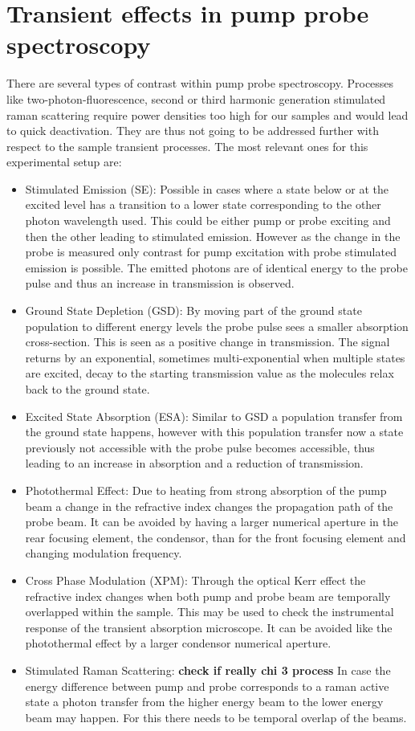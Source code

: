 \documentclass[twoside,openright]{scrreprt}
\begin{document}
\section{Transient effects in pump probe spectroscopy}
There are several types of contrast within pump probe spectroscopy. Processes like two-photon-fluorescence, second or third harmonic generation stimulated raman scattering require power densities too high for our samples and would lead to quick deactivation. They are thus not going to be addressed further with respect to the sample transient processes. The most relevant ones for this experimental setup are:\cite{10.1063/1.5129123}
\begin{itemize}
\item Stimulated Emission (SE): Possible in cases where a state below or at the  excited level has a transition to a lower state corresponding to the other photon wavelength used. This could be either pump or probe exciting and then the other leading to stimulated emission. However as the change in the probe is measured only contrast for pump excitation with probe stimulated emission is possible. The emitted photons are of identical energy to the probe pulse and thus an increase in transmission is observed.
\item Ground State Depletion (GSD): By moving part of the ground state population to different energy levels the probe pulse sees a smaller absorption cross-section. This is seen as a positive change in transmission. The signal returns by an exponential, sometimes multi-exponential when multiple states are excited, decay to the starting transmission value as the molecules relax back to the ground state.
\item Excited State Absorption (ESA): Similar to GSD a population transfer from the ground state happens, however with this population transfer now a state previously not accessible with the probe pulse becomes accessible, thus leading to an increase in absorption and a reduction of transmission.
\item Photothermal Effect: Due to heating from strong absorption of the pump beam a change in the refractive index changes the propagation path of the probe beam. It can be avoided by having a larger numerical aperture in the rear focusing element, the condensor, than for the front focusing element and changing modulation frequency.
\item Cross Phase Modulation (XPM): Through the optical Kerr effect the refractive index changes when both pump and probe beam are temporally overlapped within the sample. This may be used to check the instrumental response of the transient absorption microscope. It can be avoided like the photothermal effect by a larger condensor numerical aperture.
\item Stimulated Raman Scattering: \textbf{check if really chi 3 process} In case the energy difference between pump and probe corresponds to a raman active state a photon transfer from the higher energy beam to the lower energy beam may happen. For this there needs to be temporal overlap of the beams.
\end{itemize}
\end{document}
